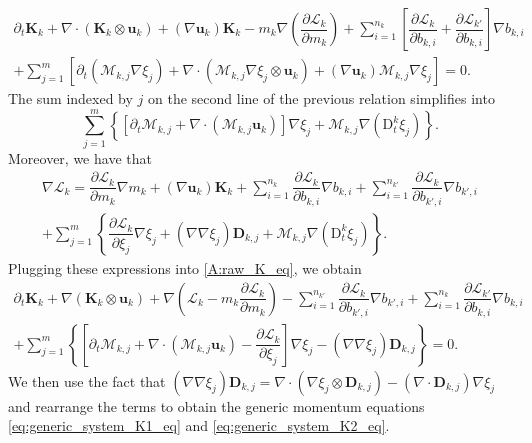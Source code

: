 \documentclass{myclass}
\newcommand{\Lag}{\mathscr{L}}
\newcommand{\Dt}{\mathrm{D}_t}
\newcommand{\vel}{\bm{u}}
\newcommand{\pth}[1]  {\left( #1 \right)}
\newcommand{\brck}[1]  {\left[ #1 \right]}
\newcommand{\acco}[1]{\left\{ #1 \right\}}
\begin{document}
\begin{multline}\label{A:raw_K_eq}
\partial_t\bm{K}_k + \nabla\cdot\pth{\bm{K}_k\otimes\vel_k} + \pth{\nabla\vel_k}\bm{K}_k - m_k\nabla\pth{\dfrac{\partial\Lag_k}{\partial m_k}}  + \sum_{i=1}^{n_k}\brck{\dfrac{\partial\Lag_k}{\partial b_{k,i}} +\dfrac{\partial \Lag_{k'}}{\partial b_{k,i}}}\nabla b_{k,i} \\
 + \sum_{j=1}^{m} \brck{\partial_t\pth{\mathscr{M}_{k,j}\nabla\xi_j} + \nabla\cdot\pth{\mathscr{M}_{k,j}\nabla\xi_j\otimes\vel_k}  + \pth{\nabla\vel_k}\mathscr{M}_{k,j}\nabla\xi_j} = 0.
\end{multline}
The sum indexed by $j$ on the second line of the previous relation simplifies into
\begin{equation}
\sum_{j=1}^{m}\acco{\brck{\partial_t\mathscr{M}_{k,j} + \nabla\cdot\pth{\mathscr{M}_{k,j}\vel_k}}\nabla\xi_j + \mathscr{M}_{k,j}\nabla\pth{\Dt^k\xi_j}}.
\end{equation}
Moreover, we have that
\begin{multline}
\nabla\Lag_k = \dfrac{\partial\Lag_k}{\partial m_k}\nabla m_k + \pth{\nabla\vel_k}\bm{K}_k + \sum_{i=1}^{n_k}\dfrac{\partial\Lag_k}{\partial b_{k,i}}\nabla b_{k,i} + \sum_{i=1}^{n_{k'}}\dfrac{\partial\Lag_k}{\partial b_{k',i}}\nabla b_{k',i}  \\
+ \sum_{j=1}^{m}\acco{\dfrac{\partial\Lag_k}{\partial\xi_j}\nabla\xi_j + \pth{\nabla\nabla\xi_j}\bm{D}_{k,j} + \mathscr{M}_{k,j}\nabla\pth{\Dt^k\xi_j}}.
\end{multline}
Plugging these expressions into \eqref{A:raw_K_eq}, we obtain
\begin{multline}
\partial_t\bm{K}_k + \nabla\pth{\bm{K}_k\otimes\vel_k} + \nabla\pth{\Lag_k-m_k\dfrac{\partial\Lag_k}{\partial m_k}}   -\sum_{i=1}^{n_{k'}}\dfrac{\partial\Lag_k}{\partial b_{k',i}}\nabla b_{k',i} + \sum_{i=1}^{n_k}\dfrac{\partial\Lag_{k'}}{\partial b_{k,i}}\nabla b_{k,i} \\
+\sum_{j=1}^{m}\acco{\brck{\partial_t \mathscr{M}_{k,j} + \nabla\cdot\pth{\mathscr{M}_{k,j}\vel_k}  - \dfrac{\partial\Lag_k}{\partial\xi_j}}\nabla\xi_j - \pth{\nabla\nabla\xi_j}\bm{D}_{k,j}} = 0.
\end{multline}
We then use the fact that $\pth{\nabla\nabla\xi_j}\bm{D}_{k,j} = \nabla\cdot\pth{\nabla\xi_j\otimes\bm{D}_{k,j}} - \pth{\nabla\cdot\bm{D}_{k,j}}\nabla\xi_j$ and rearrange the terms to obtain the generic momentum equations \eqref{eq:generic_system_K1_eq} and \eqref{eq:generic_system_K2_eq}.
\end{document}
